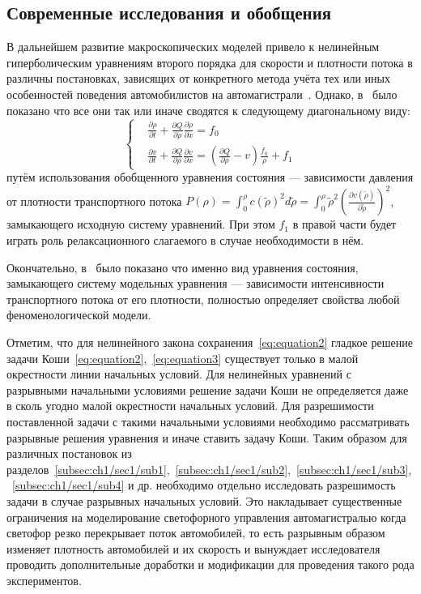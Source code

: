 \subsection{Современные исследования и обобщения}\label{subsec:ch1/sec1/sub5}
В дальнейшем развитие макроскопических моделей привело к нелинейным гиперболическим уравнениям второго порядка для скорости и плотности потока в различны постановках, зависящих от конкретного метода учёта тех или иных особенностей поведения автомобилистов на автомагистрали~\cite{payne1971model,daganzo1995requiem,papageorgiou1998some,zhang2002non,zhang2003anisotropic,siebel2006fundamental}.
Однако, в~\cite{collectiveArticle} было показано что все они так или иначе сводятся к следующему диагональному виду:
\[
\left\{
\begin{array}{rl}
  &\frac{\partial\rho}{\partial t} + \frac{\partial Q}{\partial\rho}\frac{\partial\rho}{\partial x} = f_0 \\
  &\frac{\partial v}{\partial t} + \frac{\partial Q}{\partial\rho}\frac{\partial v}{\partial x} = (\frac{\partial Q}{\partial\rho} - v) \frac{f_0}{\rho} + f_1
\end{array}
\right.
\]
путём использования обобщенного уравнения состояния --- зависимости давления от плотности транспортного потока \(P(\rho) = \int_{0}^{\rho} c(\tilde{\rho})^2 d\tilde{\rho} = \int_{0}^{\rho} \tilde{\rho}^2 (\frac{\partial v(\tilde{\rho})}{\partial \tilde{\rho}})^2\),
замыкающего исходную систему уравнений.
При этом \(f_1\) в правой части будет играть роль релаксационного слагаемого в случае необходимости в нём.

Окончательно, в~\cite{collectiveArticle} было показано что именно вид уравнения состояния, замыкающего систему модельных уравнения --- зависимости интенсивности транспортного потока от его плотности, полностью определяет свойства любой феноменологической модели.

Отметим, что для нелинейного закона сохранения~\ref{eq:equation2} гладкое решение задачи Коши~\ref{eq:equation2},~\ref{eq:equation3} существует только в малой окрестности линии начальных условий. Для нелинейных уравнений с разрывными начальными условиями решение задачи Коши не определяется даже в сколь угодно малой окрестности начальных условий.
Для разрешимости поставленной задачи с такими начальными условиями необходимо рассматривать разрывные решения уравнения и иначе ставить задачу Коши.
Таким образом для различных постановок из разделов~\ref{subsec:ch1/sec1/sub1},~\ref{subsec:ch1/sec1/sub2},~\ref{subsec:ch1/sec1/sub3},~\ref{subsec:ch1/sec1/sub4} и др. необходимо отдельно исследовать разрешимость задачи в случае разрывных начальных условий.
Это накладывает существенные ограничения на моделирование светофорного управления автомагистралью когда светофор резко перекрывает поток автомобилей, то есть разрывным образом изменяет плотность автомобилей и их скорость и вынуждает исследователя проводить дополнительные доработки и модификации для проведения такого рода экспериментов.

